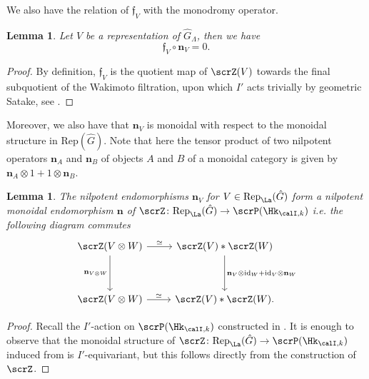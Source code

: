 \documentclass[10pt, reqno]{amsart}
\theoremstyle{plain}
\newtheorem{lemma}[theorem]{Lemma}
\theoremstyle{definition}
\numberwithin{equation}{section}
\begin{document}
	
	We also have the relation of $\mathfrak{f}_V$ with the monodromy operator.  
	
	\begin{lemma}
		\label{sec:high-weight-arrows-1-monodromy-is-zero-on-highest-weight-vector}
		Let $V$ be a representation of $\hat{G}_{\Lambda}$, then we have
		$$
		\mathfrak{f}_V \circ \mathbf{n}_V =0. 
		$$
	\end{lemma}
	
	\begin{proof}
		By definition, $\mathfrak{f}_V$ is the quotient map of $\scrZ(V)$ towards the final subquotient of the Wakimoto filtration, upon which $I'$ acts trivially by geometric Satake, see .
	\end{proof}
	
	
	Moreover, we also have that 
	$\mathbf{n}_V$ is monoidal with respect to the monoidal structure in $\mathrm{Rep}(\hat{G})$. Note that here the tensor product of two nilpotent operators $\mathbf{n}_A$ and $\mathbf{n}_B$ of objects $A$ and $B$ of a monoidal category is given by $\mathbf{n}_A\otimes 1 +1\otimes \mathbf{n}_B$.
	
	
	\begin{lemma}\label{D_P_for_n_V}
		The nilpotent endomorphisms $\mathbf{n}_V$ for $V \in \mathrm{Rep}_\La (\hat{G})$ form a nilpotent monoidal endomorphism $\mathbf{n}$ of $\scrZ\colon \mathrm{Rep}_\La (\hat{G})\to \scrP(\Hk_{\calI,k})$ i.e. the following diagram commutes
		$$
		\begin{tikzcd}[row sep=huge]
			\scrZ(V\otimes W) \arrow [r,"\simeq"] \arrow[d,"\mathbf{n}_{V\otimes W}",swap] & \scrZ(V)\ast \scrZ(W) \arrow[d,"\mathbf{n}_V\otimes \mathrm{id}_W+\mathrm{id}_V\otimes \mathbf{n}_W"] \\
			\scrZ(V\otimes W) \arrow[r,"\simeq "] &\scrZ(V)\ast \scrZ(W). 
		\end{tikzcd}
		$$
	\end{lemma}
	
	\begin{proof}
		Recall the $I'$-action on $\scrP(\Hk_{\calI,k})$ constructed in . It is enough to observe that the monoidal structure of $\scrZ\colon \mathrm{Rep}_\La (\hat{G})\to \scrP(\Hk_{\calI,k})$ induced from  is $I'$-equivariant, but this follows directly from the construction of $\scrZ$.
	\end{proof}
	
\end{document}

